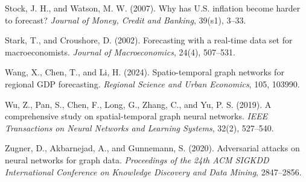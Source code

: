 \documentclass[
]{article}
\begin{document}
Stock, J. H., and Watson, M. W. (2007). Why has U.S. inflation become
harder to forecast? \emph{Journal of Money, Credit and Banking}, 39(s1),
3--33.

Stark, T., and Croushore, D. (2002). Forecasting with a real-time data
set for macroeconomists. \emph{Journal of Macroeconomics}, 24(4),
507--531.

Wang, X., Chen, T., and Li, H. (2024). Spatio-temporal graph networks
for regional GDP forecasting. \emph{Regional Science and Urban
Economics}, 105, 103990.

Wu, Z., Pan, S., Chen, F., Long, G., Zhang, C., and Yu, P. S. (2019). A
comprehensive study on spatial-temporal graph neural networks.
\emph{IEEE Transactions on Neural Networks and Learning Systems}, 32(2),
527--540.

Zugner, D., Akbarnejad, A., and Gunnemann, S. (2020). Adversarial
attacks on neural networks for graph data. \emph{Proceedings of the 24th
ACM SIGKDD International Conference on Knowledge Discovery and Data
Mining}, 2847--2856.
\end{document}
